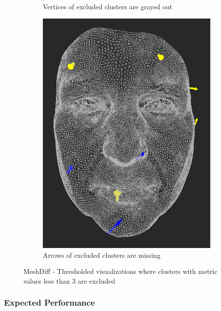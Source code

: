 \begin{figure}[h]
\begin{subfigure}{0.4\textwidth}
    \caption{Vertices of excluded clusters are grayed out}
    \label{fig:meshdiff-thresholding_clustercolor}
	\end{subfigure}
    \qquad
    \begin{subfigure}{0.4\textwidth}
	\includegraphics[width=\textwidth]{./img/meshdiff-thresholding-arrows-length3.PNG}
    \caption{Arrows of excluded clusters are missing}
    \label{fig:meshdiff-thresholding_arrows}
	\end{subfigure}
    
\caption[MeshDiff - Thresholded visualizations]{MeshDiff - Thresholded visualizations where clusters with metric values less than 3 are excluded}
\label{fig:meshdiff-thresholding}
\end{figure}

\subsubsection{Expected Performance}

